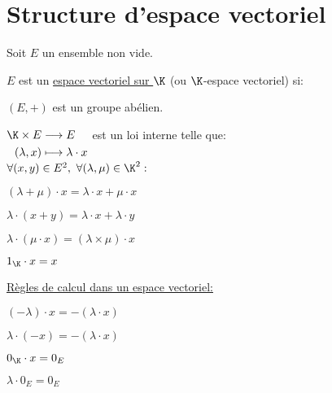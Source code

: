 \documentclass[12pt,twoside,a4paper]{article}
\author{MPSI 2}
\begin{document}
	\maketitle
	\section{Structure d'espace vectoriel}
		Soit $E$ un ensemble non vide.
		\begin{defi}
			$E$ est un \underline{espace vectoriel sur $\K$} (ou $\K$-espace vectoriel) si:
			\begin{liste}
				\item $(E,+)$ est un groupe ab\'elien.
				\item $\begin{aligned}[t]\K\times E&\longrightarrow E \\(\lambda,x)&\longmapsto \lambda\cdot x\end{aligned}$ est un loi interne telle que:\\
				$\forall (x,y)\in E^{2},\ \forall (\lambda,\mu)\in\K^{2}:$
				\begin{liste}
					\item $(\lambda+\mu)\cdot x=\lambda\cdot x+\mu\cdot x$
					\item $\lambda\cdot(x+y)=\lambda\cdot x+\lambda\cdot y$
					\item $\lambda\cdot(\mu\cdot x)=(\lambda\times\mu)\cdot x$
					\item $1_\K\cdot x=x$
				\end{liste}
			\end{liste}
		\end{defi}
		\begin{flushleft}
			\underline{R\`egles de calcul dans un espace vectoriel:}
			\begin{liste}
				\item $(-\lambda)\cdot x=-(\lambda\cdot x)$
				\item $\lambda\cdot (-x)=-(\lambda\cdot x)$
				\item $0_\K\cdot x=0_E$
				\item $\lambda\cdot 0_E=0_E$
			\end{liste}
		\end{flushleft}
\end{document}
